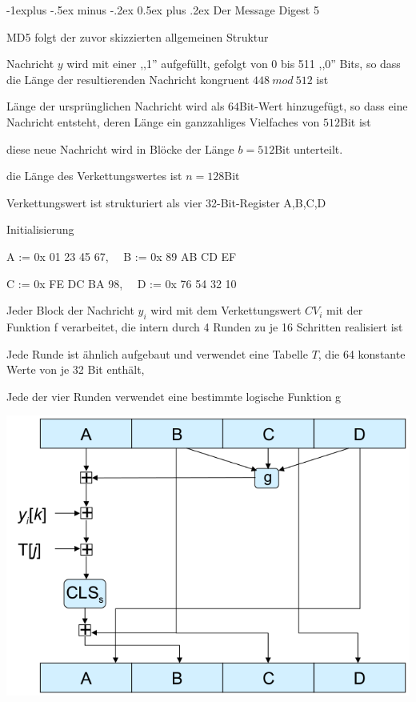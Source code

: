 \documentclass[a4paper]{article}
\makeatletter
\renewcommand{\subsection}{\@startsection{subsection}{2}{0mm}%
 {-1explus -.5ex minus -.2ex}%
 {0.5ex plus .2ex}%
 {\normalfont\normalsize\bfseries}}
\makeatother
\begin{document}
\begin{multicols}{3}
      \subsection{Der Message Digest 5}
      \begin{itemize*}
            \item MD5 folgt der zuvor skizzierten allgemeinen Struktur
            \item Nachricht $y$ wird mit einer ,,1'' aufgefüllt, gefolgt von 0 bis 511 ,,0'' Bits, so dass die Länge der resultierenden Nachricht kongruent $448\ mod\ 512$ ist
            \item Länge der ursprünglichen Nachricht wird als $64$Bit-Wert hinzugefügt, so dass eine Nachricht entsteht, deren Länge ein ganzzahliges Vielfaches von $512$Bit ist
            \item diese neue Nachricht wird in Blöcke der Länge $b=512$Bit unterteilt.
            \item die Länge des Verkettungswertes ist $n=128$Bit
            \item Verkettungswert ist strukturiert als vier 32-Bit-Register A,B,C,D
            \item Initialisierung
            \begin{itemize*}
                  \item A := 0x 01 23 45 67,$\quad$ B := 0x 89 AB CD EF
                  \item C := 0x FE DC BA 98,$\quad$ D := 0x 76 54 32 10
            \end{itemize*}
            \item Jeder Block der Nachricht $y_i$ wird mit dem Verkettungswert $CV_i$ mit der Funktion f verarbeitet, die intern durch 4 Runden zu je 16 Schritten realisiert ist
            \begin{itemize*}
                  \item Jede Runde ist ähnlich aufgebaut und verwendet eine Tabelle $T$, die 64 konstante Werte von je 32 Bit enthält,
                  \item Jede der vier Runden verwendet eine bestimmte logische Funktion g
            \end{itemize*}
            \item \includegraphics[width=.4\linewidth]{Assets/NetworkSecurity-md5.png}

\end{itemize*}
\end{multicols}
\end{document}
